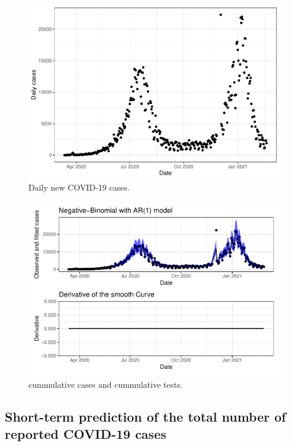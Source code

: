 \documentclass[10pt,letterpaper]{article}
\begin{document}
\begin{figure}
\includegraphics[width=0.99\linewidth]{COVIDincidenceSA_files/figure-latex/unnamed-chunk-4-1} \caption{Daily new COVID-19 cases.}\label{fig:unnamed-chunk-4}
\end{figure}

\begin{figure}
\includegraphics[width=0.99\linewidth]{COVIDincidenceSA_files/figure-latex/unnamed-chunk-5-1} \caption{cummulative cases and cummulative tests.}\label{fig:unnamed-chunk-5}
\end{figure}

\hypertarget{short-term-prediction-of-the-total-number-of-reported-covid-19-cases}{%
\subsection{Short-term prediction of the total number of reported
COVID-19
cases}\label{short-term-prediction-of-the-total-number-of-reported-covid-19-cases}}
\end{document}
